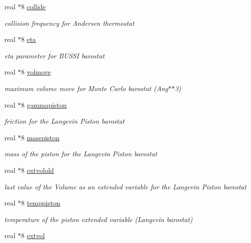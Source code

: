 \begin{DoxyCompactItemize}
real $\ast$8 \hyperlink{classbath_a911ccc561fe5c658057896f4017a1e85}{collide}
\begin{DoxyCompactList}\small\item\em collision frequency for Andersen thermostat \end{DoxyCompactList}\item 
real $\ast$8 \hyperlink{classbath_a8b478b12a863eb9d056a1195f737df5d}{eta}
\begin{DoxyCompactList}\small\item\em eta parameter for B\-U\-S\-S\-I barostat \end{DoxyCompactList}\item 
real $\ast$8 \hyperlink{classbath_aa2403c502d6b8f67a5ebf3f1010f6aa4}{volmove}
\begin{DoxyCompactList}\small\item\em maximum volume move for Monte Carlo barostat (Ang$\ast$$\ast$3) \end{DoxyCompactList}\item 
real $\ast$8 \hyperlink{classbath_a7b3b6c32c51e4405e4c4948d2aa3d8b9}{gammapiston}
\begin{DoxyCompactList}\small\item\em friction for the Langevin Piston barostat \end{DoxyCompactList}\item 
real $\ast$8 \hyperlink{classbath_aa9f430eecd1545822ec94aab78e0536b}{masspiston}
\begin{DoxyCompactList}\small\item\em mass of the piston for the Langevin Piston barostat \end{DoxyCompactList}\item 
real $\ast$8 \hyperlink{classbath_a4024f294b8428f4eae1cdaf3a06ddf7e}{extvolold}
\begin{DoxyCompactList}\small\item\em last value of the Volume as an extended variable for the Langevin Piston barostat \end{DoxyCompactList}\item 
real $\ast$8 \hyperlink{classbath_a354d5cdd8a7c243a018af69e9532456d}{temppiston}
\begin{DoxyCompactList}\small\item\em temperature of the piston extended variable (Langevin barostat) \end{DoxyCompactList}\item 
real $\ast$8 \hyperlink{classbath_a962ae932f22d93aaa3d48d2bb5b0c914}{extvol}

\end{DoxyCompactItemize}
